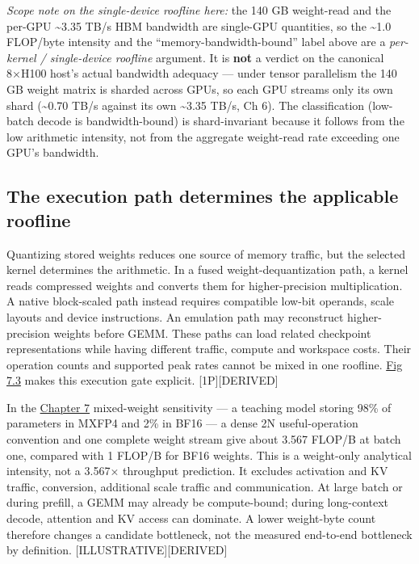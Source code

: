 \emph{Scope note on the single-device roofline here:} the 140 GB
weight-read and the per-GPU \textasciitilde3.35 TB/s HBM bandwidth are
single-GPU quantities, so the \textasciitilde1.0 FLOP/byte intensity and
the ``memory-bandwidth-bound'' label above are a \emph{per-kernel /
single-device roofline} argument. It is \textbf{not} a verdict on the
canonical 8×H100 host's actual bandwidth adequacy --- under tensor
parallelism the 140 GB weight matrix is sharded across GPUs, so each GPU
streams only its own shard (\textasciitilde0.70 TB/s against its own
\textasciitilde3.35 TB/s, Ch 6). The classification (low-batch decode is
bandwidth-bound) is shard-invariant because it follows from the low
arithmetic intensity, not from the aggregate weight-read rate exceeding
one GPU's bandwidth.

\subsection{The execution path determines the applicable
roofline}\label{the-execution-path-determines-the-applicable-roofline}

Quantizing stored weights reduces one source of memory traffic, but the
selected kernel determines the arithmetic. In a fused
weight-dequantization path, a kernel reads compressed weights and
converts them for higher-precision multiplication. A native block-scaled
path instead requires compatible low-bit operands, scale layouts and
device instructions. An emulation path may reconstruct higher-precision
weights before GEMM. These paths can load related checkpoint
representations while having different traffic, compute and workspace
costs. Their operation counts and supported peak rates cannot be mixed
in one roofline. \hyperref[fig:7.3]{Fig 7.3} makes this execution gate explicit.
\mbox{{[}1P{]}}\hspace{0pt}\mbox{{[}DERIVED{]}}

In the \hyperref[chap:7]{Chapter 7} mixed-weight sensitivity --- a teaching model storing
98\% of parameters in MXFP4 and 2\% in BF16 --- a dense 2N
useful-operation convention and one complete weight stream give about
3.567 FLOP/B at batch one, compared with 1 FLOP/B for BF16 weights. This
is a weight-only analytical intensity, not a 3.567× throughput
prediction. It excludes activation and KV traffic, conversion,
additional scale traffic and communication. At large batch or during
prefill, a GEMM may already be compute-bound; during long-context
decode, attention and KV access can dominate. A lower weight-byte count
therefore changes a candidate bottleneck, not the measured end-to-end
bottleneck by definition. \mbox{{[}ILLUSTRATIVE{]}}\hspace{0pt}\mbox{{[}DERIVED{]}}

